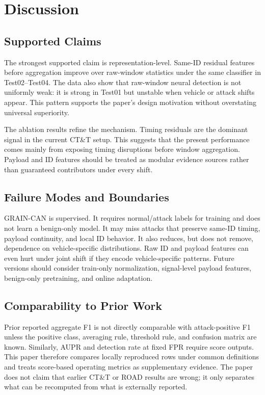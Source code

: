 \documentclass[runningheads]{llncs}
\newcommand{\method}{GRAIN-CAN}
\begin{document}
\section{Discussion}
\subsection{Supported Claims}
The strongest supported claim is representation-level. Same-ID residual features before aggregation improve over raw-window statistics under the same classifier in Test02--Test04. The data also show that raw-window neural detection is not uniformly weak: it is strong in Test01 but unstable when vehicle or attack shifts appear. This pattern supports the paper's design motivation without overstating universal superiority.

The ablation results refine the mechanism. Timing residuals are the dominant signal in the current CT\&T setup. This suggests that the present performance comes mainly from exposing timing disruptions before window aggregation. Payload and ID features should be treated as modular evidence sources rather than guaranteed contributors under every shift.

\subsection{Failure Modes and Boundaries}
\method{} is supervised. It requires normal/attack labels for training and does not learn a benign-only model. It may miss attacks that preserve same-ID timing, payload continuity, and local ID behavior. It also reduces, but does not remove, dependence on vehicle-specific distributions. Raw ID and payload features can even hurt under joint shift if they encode vehicle-specific patterns. Future versions should consider train-only normalization, signal-level payload features, benign-only pretraining, and online adaptation.

\subsection{Comparability to Prior Work}
Prior reported aggregate F1 is not directly comparable with attack-positive F1 unless the positive class, averaging rule, threshold rule, and confusion matrix are known. Similarly, AUPR and detection rate at fixed FPR require score outputs. This paper therefore compares locally reproduced rows under common definitions and treats score-based operating metrics as supplementary evidence. The paper does not claim that earlier CT\&T or ROAD results are wrong; it only separates what can be recomputed from what is externally reported.
\end{document}
